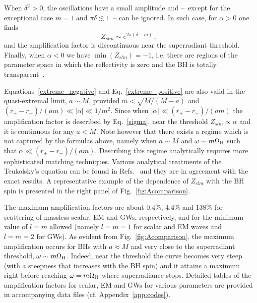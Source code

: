 \documentclass[11pt]{article}
\numberwithin{equation}{section} %
\begin{document}
When $\delta^2>0$, the oscillations have a small amplitude and --~except for the exceptional case $m=1$ and $\pi\delta\lesssim1$~-- can be ignored. In such case, for $\alpha>0$ one finds
%
\begin{equation}
 Z_{slm}\sim e^{2\pi(\delta-m)}\,,
\end{equation}
%
and the amplification factor is discontinuous near the superradiant threshold. Finally, when $\alpha<0$ we have $\min(Z_{slm})=-1$, i.e. there are regions of the parameter space in which the reflectivity is zero and the BH is totally transparent~\cite{Starobinski:1973,Starobinski2:1973}.

Equations~\eqref{extreme_negative} and Eq.~\eqref{extreme_positive} are also valid in the quasi-extremal limit, $a\sim M$, provided $m<\sqrt{M/(M-a)}$ and $(r_+-r_-)/(am)\ll|\alpha|\ll1/m^2$. Since when $|\alpha|\ll (r_+-r_-)/(am)$ the amplification factor is described by Eq.~\eqref{sigma}, near the threshold $Z_{slm}\propto\alpha$ and it is continuous for any $a<M$.
Note however that there exists a regime which is not captured by the formulas above, namely when $a\sim M$ and $\omega\sim m\Omega_{\rm H}$ such that $\alpha\ll (r_+-r_-)/(am)$. Describing this regime analytically requires more sophisticated matching techniques. Various analytical treatments of the Teukolsky's equation can be found in Refs.~\cite{Hod:2013zza,Hod:2012px,Hod:2012bw,Hod:2012zzb,Hod:2014dda} and they are in agreement with the exact results. A representative example of the dependence of $Z_{slm}$ with the BH spin is presented in the right panel of Fig.~\ref{fig:Acomparison}.

The maximum amplification factors are about $0.4\%$, $4.4\%$ and $138\%$ for scattering of massless scalar, 
EM and GWs, respectively, and for the minimum value of $l=m$ allowed (namely $l=m=1$ for scalar and 
EM waves and $l=m=2$ for GWs). As evident from Fig.~\ref{fig:Acomparison}, the maximum 
amplification occurs for BHs with $a\approx M$ and very close to the superradiant threshold, $\omega\sim m\Omega_{\rm 
H}$. Indeed, near the threshold the curve becomes very steep (with a steepness that increases with the BH spin) and it 
attains a maximum right before reaching $\omega=m\Omega_{\rm H}$ where superradiance stops. Detailed tables of the 
amplification factors for scalar, EM and GWs for various parameters are provided in accompanying data 
files (cf. Appendix~\ref{app:codes}).
\end{document}
